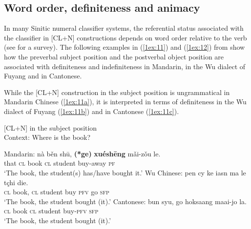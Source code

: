 \documentclass[output=paper]{langsci/langscibook}
\begin{document}
\subsection{Word order, definiteness and animacy}\label{1sec:33}
In many Sinitic  numeral classifier systems, the referential status associated with the classifier in [CL+N] constructions depends on word order relative to the verb (see \citealt{wang:15} for a survey). The following examples in (\ref{1ex:11}) and (\ref{1ex:12}) from \cite{li:bisang:12} show how the preverbal subject position and the postverbal object position are associated with definiteness and indefiniteness in Mandarin, in the Wu dialect of Fuyang and in Cantonese.

While the [CL+N] construction in the subject position is ungrammatical in Mandarin Chinese (\ref{1ex:11a}), it is interpreted in terms of definiteness in the Wu dialect of Fuyang (\ref{1ex:11b}) and in Cantonese (\ref{1ex:11c}).

\begin{exe}
\ex\label{1ex:11}
[CL+N] in the subject position \citep[][338]{li:bisang:12} \\
Context: Where is the book?
	\begin{xlista}
	\ex\label{1ex:11a}
	Mandarin:
	\exi{}
	\gll nà    běn   shū,     {\textbf{(*ge)}} {\textbf{xuéshēng}}  mǎi-zǒu     le. \\
	     that  {\textsc{cl}}   book    {\textsc{cl}}    student       buy-away  {\textsc{pf}} \\
	\glt `The book, the student(s) has/have bought it.'
	\ex\label{1ex:11b}
	Wu Chinese:
	\exi{}
	\gll pen   cy      ke    ia\textglotstop sn        ma    le         tçhi   die. \\
	      {\textsc{cl}}    book, {\textsc{cl}}  student    buy   {\textsc{pfv}}     go    {\textsc{sfp}} \\
	\glt `The book, the student bought (it).'
	\ex\label{1ex:11c}
	Cantonese:
	\exi{}
	\gll bun  syu,    go   hoksaang    maai-jo     la. \\
	      {\textsc{cl}}   book  {\textsc{cl}}   student       buy-{\textsc{pfv}}   {\textsc{sfp}} \\
 	\glt `The book, the student bought (it).'
	\end{xlista}
\end{exe}
\end{document}
